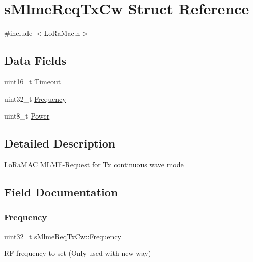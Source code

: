 \hypertarget{structsMlmeReqTxCw}{}\section{s\+Mlme\+Req\+Tx\+Cw Struct Reference}
\label{structsMlmeReqTxCw}


{\ttfamily \#include $<$Lo\+Ra\+Mac.\+h$>$}

\subsection*{Data Fields}
\begin{DoxyCompactItemize}
\item 
uint16\+\_\+t \hyperlink{structsMlmeReqTxCw_a62e506374c3c4b59c4ef10d01e02768f}{Timeout}
\item 
uint32\+\_\+t \hyperlink{structsMlmeReqTxCw_afcb3ef248fb26e2bdc04720801464825}{Frequency}
\item 
uint8\+\_\+t \hyperlink{structsMlmeReqTxCw_ab9e35e3b76d695b3e14efcdc6eab6f55}{Power}
\end{DoxyCompactItemize}


\subsection{Detailed Description}
Lo\+Ra\+M\+AC M\+L\+M\+E-\/\+Request for Tx continuous wave mode 

\subsection{Field Documentation}
\mbox{\label{structsMlmeReqTxCw_afcb3ef248fb26e2bdc04720801464825}} 
\subsubsection{\texorpdfstring{Frequency}{Frequency}}
{\footnotesize\ttfamily uint32\+\_\+t s\+Mlme\+Req\+Tx\+Cw\+::\+Frequency}

RF frequency to set (Only used with new way) \mbox{\label{structsMlmeReqTxCw_ab9e35e3b76d695b3e14efcdc6eab6f55}} 
